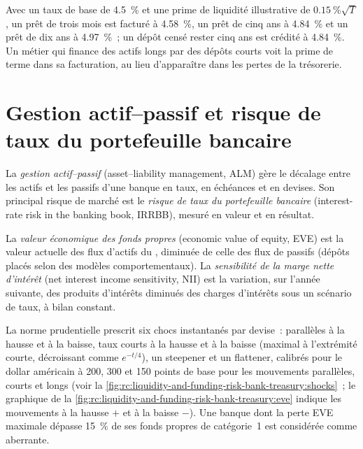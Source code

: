 \begin{example}\label{ex:rc:liquidity-and-funding-risk-bank-treasury:ftp}
Avec un taux de base de 4.5~\% et une prime de liquidité illustrative de $0.15~\%\sqrt T$, un prêt de trois mois est
facturé à 4.58~\%, un prêt de cinq ans à 4.84~\% et un prêt de dix ans à 4.97~\%~; un dépôt censé rester cinq ans
est crédité à 4.84~\%. Un métier qui finance des actifs longs par des dépôts courts voit la prime de terme dans sa
facturation, au lieu d'apparaître dans les pertes de la trésorerie.
\end{example}

\section{Gestion actif--passif et risque de taux du portefeuille bancaire}

\begin{definition}\label{def:rc:liquidity-and-funding-risk-bank-treasury:alm}
La \emph{gestion actif--passif} (asset--liability management, ALM) gère le décalage
entre les actifs et les passifs d'une banque en taux, en échéances et en devises. Son principal risque de marché est
le \emph{risque de taux du portefeuille bancaire}
(interest-rate risk in the banking book, IRRBB), mesuré en valeur et en résultat.
\end{definition}

\begin{definition}\label{def:rc:liquidity-and-funding-risk-bank-treasury:eve}
La \emph{valeur économique des fonds propres} (economic value of equity, EVE) est la valeur actuelle des
flux d'actifs du , diminuée de celle des flux de passifs (dépôts placés selon des
modèles comportementaux). La \emph{sensibilité de la marge nette d'intérêt} (net interest income sensitivity, NII) est
la variation, sur l'année suivante, des produits d'intérêts diminués des charges d'intérêts sous un scénario de taux, à
bilan constant.
\end{definition}

La norme prudentielle prescrit six chocs instantanés par devise~: parallèles à la hausse et à la baisse,
taux courts à la hausse et à la baisse (maximal à l'extrémité courte, décroissant comme $e^{-t/4}$), un steepener et un
flattener, calibrés pour le dollar américain à 200, 300 et 150 points de base pour les mouvements parallèles, courts et longs
(voir la \cref{fig:rc:liquidity-and-funding-risk-bank-treasury:shocks}~; le graphique de la \cref{fig:rc:liquidity-and-funding-risk-bank-treasury:eve} indique les mouvements à la hausse $+$ et à la baisse $-$). Une banque dont la perte EVE maximale
dépasse 15~\% de ses fonds propres de catégorie~1 est considérée comme aberrante.

